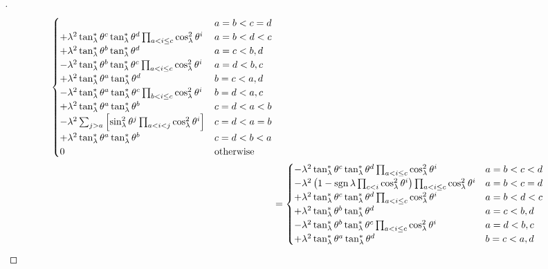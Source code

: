 \documentclass[../main.tex]{subfiles}
\begin{document}
\begin{proof}[]
\begin{align*}
\begin{cases}
&\text{$a=b<c=d$}\\
+\lambda^2\tan_\lambda^\ast\tensor{\theta}{^c}\tan_\lambda^\ast\tensor{\theta}{^d}\prod_{a<i\le c}\cos_\lambda^2\tensor{\theta}{^i}
&\text{$a=b<d<c$}\\
+\lambda^2\tan_\lambda^\ast\tensor{\theta}{^b}\tan_\lambda^\ast\tensor{\theta}{^d}
&\text{$a=c<b,d$}\\
-\lambda^2\tan_\lambda^\ast\tensor{\theta}{^b}\tan_\lambda^\ast\tensor{\theta}{^c}\prod_{a<i\le c}\cos_\lambda^2\tensor{\theta}{^i}
&\text{$a=d<b,c$}\\
+\lambda^2\tan_\lambda^\ast\tensor{\theta}{^a}\tan_\lambda^\ast\tensor{\theta}{^d}
&\text{$b=c<a,d$}\\
-\lambda^2\tan_\lambda^\ast\tensor{\theta}{^a}\tan_\lambda^\ast\tensor{\theta}{^c}\prod_{b<i\le c}\cos_\lambda^2\tensor{\theta}{^i}
&\text{$b=d<a,c$}\\
+\lambda^2\tan_\lambda^\ast\tensor{\theta}{^a}\tan_\lambda^\ast\tensor{\theta}{^b}
&\text{$c=d<a<b$}\\
-\lambda^2
\sum_{j>a}
\left[
\sin_\lambda^2\tensor{\theta}{^j}\prod_{a<i<j}\cos_\lambda^2\tensor{\theta}{^i}
\right]
&\text{$c=d<a=b$}\\
+\lambda^2\tan_\lambda^\ast\tensor{\theta}{^a}\tan_\lambda^\ast\tensor{\theta}{^b}
&\text{$c=d<b<a$}\\
0&\text{otherwise}\\
\end{cases}\\
&=\begin{cases}
-\lambda^2\tan_\lambda^\ast\tensor{\theta}{^c}\tan_\lambda^\ast\tensor{\theta}{^d}\prod_{a<i\le c}\cos_\lambda^2\tensor{\theta}{^i}
&\text{$a=b<c<d$}\\
-\lambda^2
\left(
1-\sign{\lambda}\prod_{c<i}\cos_\lambda^2\tensor{\theta}{^i}
\right)
\prod_{a<i\le c}\cos_\lambda^2\tensor{\theta}{^i}
&\text{$a=b<c=d$}\\
+\lambda^2\tan_\lambda^\ast\tensor{\theta}{^c}\tan_\lambda^\ast\tensor{\theta}{^d}\prod_{a<i\le c}\cos_\lambda^2\tensor{\theta}{^i}
&\text{$a=b<d<c$}\\
+\lambda^2\tan_\lambda^\ast\tensor{\theta}{^b}\tan_\lambda^\ast\tensor{\theta}{^d}
&\text{$a=c<b,d$}\\
-\lambda^2\tan_\lambda^\ast\tensor{\theta}{^b}\tan_\lambda^\ast\tensor{\theta}{^c}\prod_{a<i\le c}\cos_\lambda^2\tensor{\theta}{^i}
&\text{$a=d<b,c$}\\
+\lambda^2\tan_\lambda^\ast\tensor{\theta}{^a}\tan_\lambda^\ast\tensor{\theta}{^d}
&\text{$b=c<a,d$}\\

\end{cases}
\end{align*}
\end{proof}
\end{document}
